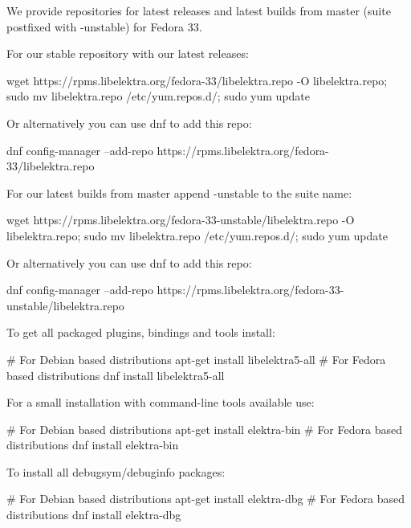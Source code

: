 We provide repositories for latest releases and latest builds from master (suite postfixed with {\ttfamily -\/unstable}) for Fedora 33.

For our stable repository with our latest releases\+:


\begin{DoxyCode}
wget https://rpms.libelektra.org/fedora-33/libelektra.repo -O libelektra.repo;
sudo mv libelektra.repo /etc/yum.repos.d/;
sudo yum update
\end{DoxyCode}


Or alternatively you can use dnf to add this repo\+:


\begin{DoxyCode}
dnf config-manager --add-repo https://rpms.libelektra.org/fedora-33/libelektra.repo
\end{DoxyCode}


For our latest builds from master append {\ttfamily -\/unstable} to the suite name\+:


\begin{DoxyCode}
wget https://rpms.libelektra.org/fedora-33-unstable/libelektra.repo -O libelektra.repo;
sudo mv libelektra.repo /etc/yum.repos.d/;
sudo yum update
\end{DoxyCode}


Or alternatively you can use dnf to add this repo\+:


\begin{DoxyCode}
dnf config-manager --add-repo https://rpms.libelektra.org/fedora-33-unstable/libelektra.repo
\end{DoxyCode}


To get all packaged plugins, bindings and tools install\+:


\begin{DoxyCode}
# For Debian based distributions
apt-get install libelektra5-all
# For Fedora based distributions
dnf install libelektra5-all
\end{DoxyCode}


For a small installation with command-\/line tools available use\+:


\begin{DoxyCode}
# For Debian based distributions
apt-get install elektra-bin
# For Fedora based distributions
dnf install elektra-bin
\end{DoxyCode}


To install all debugsym/debuginfo packages\+:


\begin{DoxyCode}
# For Debian based distributions
apt-get install elektra-dbg
# For Fedora based distributions
dnf install elektra-dbg
\end{DoxyCode}


